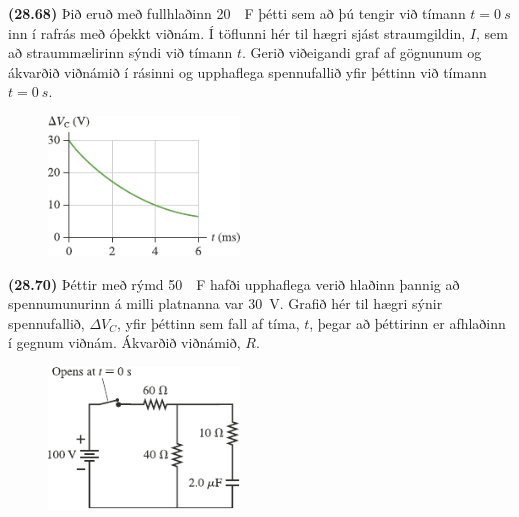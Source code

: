 \begin{enumerate}[label = \textbf{(\alph*)}]
\begin{minipage}{\linewidth}
\item[\textbf{(28.68)}] Þið eruð með fullhlaðinn \SI{20}{\mu F} þétti sem að þú tengir við tímann $t = \SI{0}{s}$ inn í rafrás með óþekkt viðnám. Í töflunni hér til hægri sjást straumgildin, $I$, sem að straummælirinn sýndi við tímann $t$. Gerið viðeigandi graf af gögnunum og ákvarðið viðnámið í rásinni og upphaflega spennufallið yfir þéttinn við tímann $t = \SI{0}{s}$.

\end{minipage}

\vspace{1cm}

\begin{minipage}{\linewidth}
\begin{figure}
\vspace{-0.5cm}
\includegraphics[width = 2in]{figures/rk2870.pdf}
\end{figure}

\item[\textbf{(28.70)}] Þéttir með rýmd \SI{50}{\mu F} hafði upphaflega verið hlaðinn þannig að spennumunurinn á milli platnanna var \SI{30}{V}. Grafið hér til hægri sýnir spennufallið, $\Delta V_C$, yfir þéttinn sem fall af tíma, $t$, þegar að þéttirinn er afhlaðinn í gegnum viðnám. Ákvarðið viðnámið, $R$.
\end{minipage}

\vspace{3cm}

\begin{minipage}{\linewidth}
\begin{figure}
\vspace{-0.5cm}
\includegraphics[width = 2in]{figures/rk2880.pdf}
\end{figure}


\end{minipage}
\end{enumerate}
